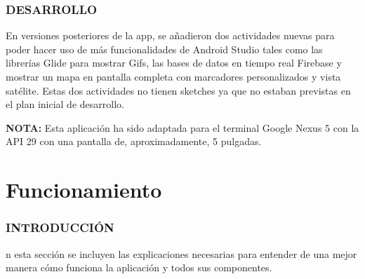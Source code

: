 \documentclass[letterpaper,twocolumn,openany,nodeprecatedcode,dvipsnames,nomultitoc]{dndbook}
\begin{document}
\begin{justify}
\section{DESARROLLO}
\vspace{3pt}
En versiones posteriores de la app, se añadieron dos actividades nuevas para poder hacer uso de más funcionalidades de Android Studio tales como las librerías Glide para mostrar Gifs, las bases de datos en tiempo real Firebase y mostrar un mapa en pantalla completa con marcadores personalizados y vista satélite. Estas dos actividades no tienen sketches ya que no estaban previstas en el plan inicial de desarrollo.

\begin{DndReadAloud}
  \textbf{NOTA: }Esta aplicación ha sido adaptada para el terminal Google Nexus 5 con la API 29 con una pantalla de, aproximadamente, 5 pulgadas.
\end{DndReadAloud}

\end{justify}

\part{Funcionamiento}
\vspace{10pt}
\section{INTRODUCCIÓN}
\vspace{5pt}

\begin{justify}

n esta sección se incluyen las explicaciones necesarias para entender de una mejor manera cómo funciona la aplicación y todos sus componentes. 

\end{justify}
\end{document}
